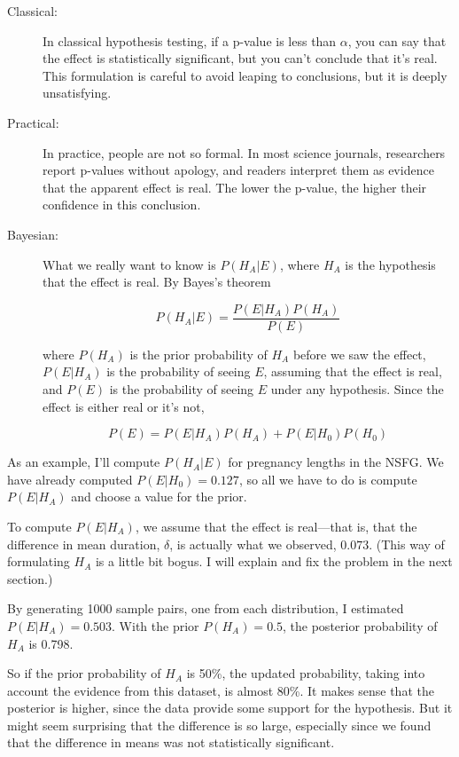 \documentclass[12pt]{book}
\begin{document}
\begin{description}

\item[Classical:] In classical hypothesis testing, if a p-value
  is less than $\alpha$, you can say that the effect is statistically
  significant, but you can't conclude that it's real.  This
  formulation is careful to avoid leaping to conclusions, but it is
  deeply unsatisfying.

\item[Practical:] In practice, people are not so formal.  In most
  science journals, researchers report p-values without apology, and
  readers interpret them as evidence that the apparent effect is real.
  The lower the p-value, the higher their confidence in this
  conclusion.

\item[Bayesian:] What we really want to know is $P(H_A | E)$, where
  $H_A$ is the hypothesis that the effect is real.  By Bayes's theorem

  \[ P(H_A | E) = \frac{P(E | H_A) P(H_A)}{P(E)} \]
  
  where $P(H_A)$ is the prior probability of $H_A$ before we saw the
  effect, $P(E | H_A)$ is the probability of seeing $E$, assuming that
  the effect is real, and $P(E)$ is the probability of seeing $E$
  under any hypothesis.  Since the effect is either real or it's not,

  \[ P(E) = P(E | H_A) P(H_A) + P(E | H_0) P(H_0) \]

\end{description}

As an example, I'll compute $P(H_A | E)$ for pregnancy lengths in the
NSFG.  We have already computed $P(E | H_0)=0.127$, so all we have to
do is compute $P(E | H_A)$ and choose a value for the prior.

To compute $P(E | H_A)$, we assume that the effect is real---that is,
that the difference in mean duration, $\delta$, is actually what we
observed, $0.073$.  (This way of formulating $H_A$ is a little bit
bogus.  I will explain and fix the problem in the next section.)

By generating 1000 sample pairs, one from each
distribution, I estimated $P(E | H_A) = 0.503$.  With the prior
$P(H_A)=0.5$, the posterior probability of $H_A$ is 0.798.


So if the prior probability of $H_A$ is 50\%, the updated
probability, taking into account the evidence from this dataset,
is almost 80\%.  It makes sense that the posterior
is higher, since the data provide some support for the hypothesis.
But it might seem surprising that the difference is so large,
especially since we found that the difference in means was not
statistically significant.
\end{document}
